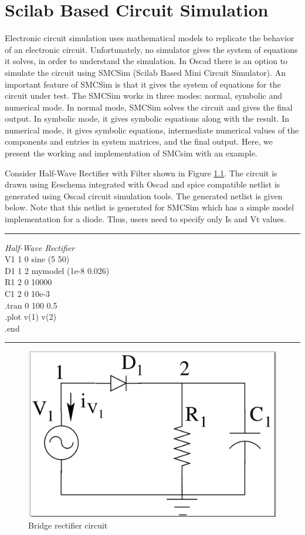 \chapter {Scilab  Based Circuit Simulation}
\label{chap9}
Electronic circuit simulation uses mathematical models to replicate the behavior of an electronic circuit. Unfortunately, no simulator gives the system of equations it solves, in order to understand the simulation. In Oscad there is an option to simulate the circuit using SMCSim (Scilab Based Mini Circuit Simulator). An important feature of SMCSim is that it gives the system of equations for the circuit under test. The SMCSim works in three modes: normal, symbolic and numerical mode. In normal mode, SMCSim solves the circuit and gives the final output. In symbolic mode, it gives symbolic equations along with the result. In numerical mode, it gives symbolic equations, intermediate numerical values of the components and entries in system matrices, and the final output. Here, we present the working and implementation of SMCsim with an example. 

Consider Half-Wave Rectifier with Filter shown in Figure \ref{br}. The circuit is drawn using Eeschema integrated with Oscad and spice compatible netlist is generated using Oscad circuit simulation tools. The generated netlist is given below. Note that this netlist is generated for SMCSim which has a simple model implementation for a diode. Thus, users need to specify only Is and Vt values.\\

\hrule
{\it * Half-Wave Rectifier} \\
V1 1 0 sine (5 50) \\
D1 1 2 mymodel (1e-8 0.026) \\
R1 2 0 10000 \\
C1 2 0 10e-3 \\
.tran 0 100 0.5 \\
.plot v(1) v(2) \\
.end\\
\hrule

\begin{figure}[h]%
\begin{center}
\includegraphics[width=0.5\linewidth]{figures/bridge-rectifier-circuit.png}%
\caption{Bridge rectifier circuit}
\label{br}
\end{center}
\end{figure}

